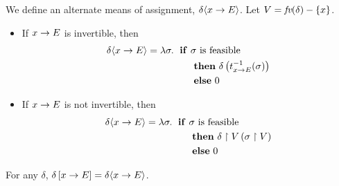 \begin{definition} We define an alternate means of assignment,
$ \delta \langle x \rightarrow E \rangle $. Let $ V = \textit{fv}(\delta) - \left\{ x \right\} $.

\begin{itemize}
\item{} If $ x \rightarrow E $ is invertible, then
\begin{align*}
\delta \langle x \rightarrow E \rangle = \lambda \sigma . \; \text{ \textbf{if} } & \sigma \text{ is
feasible} \\
& \text{ \textbf{then} } \delta \left( t_{x \rightarrow E}^{-1}(\sigma) \right) \\
& \text{ \textbf{else} } 0
\end{align*}
\item{} If $ x \rightarrow E $ is not invertible, then
\begin{align*}
\delta \langle x \rightarrow E \rangle = \lambda \sigma . \; \text{ \textbf{if} } & \sigma \text{ is
feasible} \\
& \text{ \textbf{then} } \delta \upharpoonright V \left( \sigma \upharpoonright V \right) \\
& \text{ \textbf{else} } 0
\end{align*}
\end{itemize}

\end{definition}

\begin{lemma} \label{thm:pp:assign:eqdef} For any $ \delta $, $ \delta \left[ x \rightarrow E \right]
= \delta \langle x \rightarrow E \rangle $.
\end{lemma}

